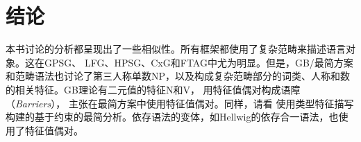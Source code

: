 \chapter{结论}

本书讨论的分析都呈现出了一些相似性。所有框架都使用了复杂范畴来描述语言对象。这在GPSG\indexgpsgc、
LFG\indexlfgc、HPSG\indexhpsgc、CxG\indexcxgc 和FTAG\indextagc 中尤为明显。但是，GB/最简方案和范畴语法也讨论了第三人称单数NP，以及构成复杂范畴部分的词类、人称和数的相关特征。GB理论有二元值的特征N和V\citep[]{Chomsky70a}， \citet[]{Stabler92a-u}用特征值偶对构成语障（\emph{Barriers}）， \citet[--291]{SE2002a}主张在最简方案\indexmpc 中使用特征值偶对。同样，请看 \citet[\page]{Veenstra98a}使用类型特征描写构建的基于约束的最简分析。依存语法的变体，如Hellwig的依存合一语法，也使用了特征值偶对\citep[]{Hellwig2003a}。

